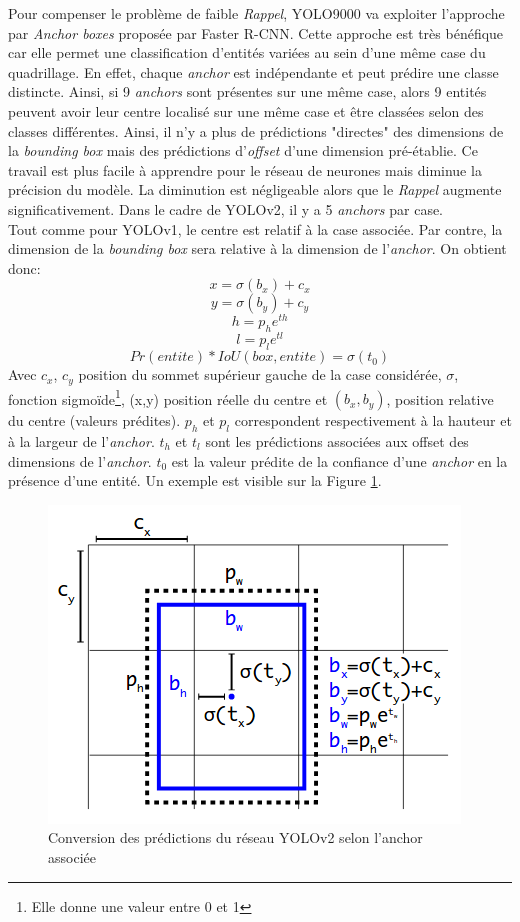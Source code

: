 \noindent Pour compenser le problème de faible \textit{Rappel}, YOLO9000 va exploiter l'approche par \textit{Anchor boxes} proposée par Faster R-CNN. Cette approche est très bénéfique car elle permet une classification d'entités variées au sein d'une même case du quadrillage. En effet, chaque \textit{anchor} est indépendante et peut prédire une classe distincte. Ainsi, si 9 \textit{anchors} sont présentes sur une même case, alors 9 entités peuvent avoir leur centre localisé sur une même case et être classées selon des classes différentes. Ainsi, il n'y a plus de prédictions "directes" des dimensions de la \textit{bounding box} mais des prédictions d'\textit{offset} d'une dimension pré-établie. Ce travail est plus facile à apprendre pour le réseau de neurones mais diminue la précision du modèle. La diminution est négligeable alors que le \textit{Rappel} augmente significativement. Dans le cadre de YOLOv2, il y a 5 \textit{anchors} par case. \\

\noindent Tout comme pour YOLOv1, le centre est relatif à la case associée. Par contre, la dimension de la \textit{bounding box} sera relative à la dimension de l'\textit{anchor}. On obtient donc:
$$ x = \sigma(b_x) + c_x $$
$$ y = \sigma(b_y) + c_y $$
$$ h = p_he^{th}$$
$$ l = p_le^{tl}$$
$$Pr(entite)*IoU(box,entite)=\sigma(t_0)$$
Avec $c_x$, $c_y$ position du sommet supérieur gauche de la case considérée, $\sigma$, fonction sigmoïde\footnote{Elle donne une valeur entre 0 et 1}, (x,y) position réelle du centre et $(b_x,b_y)$, position relative du centre (valeurs prédites). $p_h$ et $p_l$ correspondent respectivement à la hauteur et à la largeur de l'\textit{anchor}. $t_h$ et $t_l$ sont les prédictions associées aux offset des dimensions de l'\textit{anchor}. $t_0$ est la valeur prédite de la confiance d'une \textit{anchor} en la présence d'une entité. Un exemple est visible sur la Figure \ref{yolov2box}.\\

\begin{figure}
\centering
\includegraphics[scale=0.6]{./tex/computer-vision/sota/anchorbox.png}
\caption{Conversion des prédictions du réseau YOLOv2 selon l'anchor associée}
\label{yolov2box}
\end{figure}

